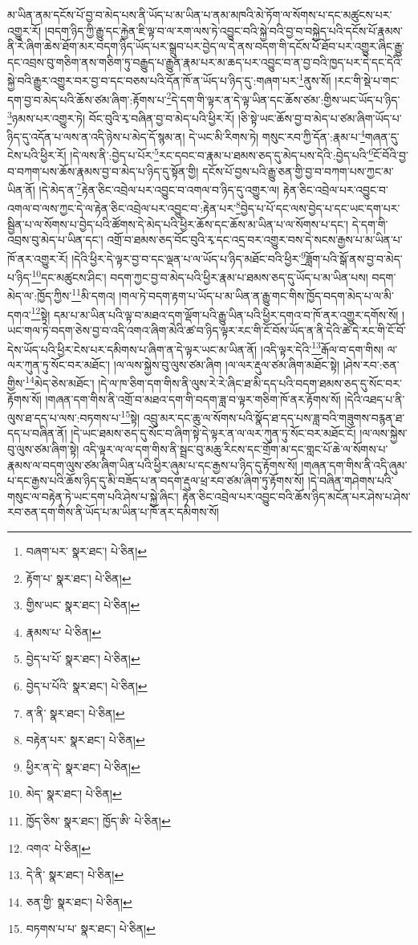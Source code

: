 མ་ཡིན་ནམ་དངོས་པོ་བྱ་བ་མེད་པས་ནི་ཡོད་པ་མ་ཡིན་པ་ནམ་མཁའི་མེ་ཏོག་ལ་སོགས་པ་དང་མཚུངས་པར་འགྱུར་རོ། །བདག་ཉིད་ཀྱི་རྒྱུ་དང་རྐྱེན་ཇི་ལྟ་བ་ལ་རག་ལས་ཏེ་འབྱུང་བའི་སྐྱེ་བའི་བྱ་བ་བསྐྱེད་པའི་དངོས་པོ་རྣམས་ནི་རེ་ཞིག་ཆེས་ཐོག་མར་བདག་ཉིད་ཡོད་པར་སྒྲུབ་པར་བྱེད་ལ་དེ་ནས་བདག་གི་དངོས་པོ་ཐོབ་པར་འགྱུར་ཞིང་རྒྱུ་དང་འབྲས་བུ་གཅིག་ནས་གཅིག་ཏུ་བརྒྱུད་པ་རྒྱུན་རྣམ་པར་མ་ཆད་པར་འབྱུང་བ་ན་བྱ་བའི་ཁྱད་པར་དེ་དང་དེའི་སྐྱེ་བའི་རྒྱུར་འགྱུར་བར་བྱ་བ་དང་བཅས་པའི་དོན་ཁོ་ན་ཡོད་པ་ཉིད་དུ་:གཞག་པར་\footnote{བཞག་པར་  སྣར་ཐང་།  པེ་ཅིན། }ནུས་སོ། །རང་གི་སྡེ་པ་གང་དག་བྱ་བ་མེད་པའི་ཆོས་ཙམ་ཞིག་:རྟོགས་པ་\footnote{རྟོག་པ་  སྣར་ཐང་།  པེ་ཅིན། }དེ་དག་གི་ལྟར་ན་དེ་ལྟ་ཡིན་དང་ཆོས་ཙམ་:གྱིས་ཡང་ཡོད་པ་ཉིད་\footnote{གྱིས་ཡང་  སྣར་ཐང་།  པེ་ཅིན། }ཉམས་པར་འགྱུར་ཏེ། བོང་བུའི་རྭ་བཞིན་བྱ་བ་མེད་པའི་ཕྱིར་རོ། །ཅི་སྟེ་ཡང་ཆོས་བྱ་བ་མེད་པ་ཙམ་ཞིག་ཡོད་པ་ཉིད་དུ་འདོན་པ་ལས་ན་འདི་ཉེས་པ་མེད་དོ་སྙམ་ན། དེ་ཡང་མི་རིགས་ཏེ། གསུང་རབ་ཀྱི་དོན་:རྣམ་པ་\footnote{རྣམས་པ་  པེ་ཅིན། }གཞན་དུ་ངེས་པའི་ཕྱིར་རོ། །དེ་ལས་ནི་:བྱེད་པ་པོར་\footnote{བྱེད་པ་པོ་  སྣར་ཐང་།  པེ་ཅིན། }རང་དབང་བ་རྣམ་པ་ཐམས་ཅད་དུ་མེད་པས་དེའི་:བྱེད་པའི་\footnote{བྱེད་པ་པོའི་  སྣར་ཐང་།  པེ་ཅིན། }ངོ་བོའི་བྱ་བ་བཀག་པས་ཆོས་རྣམས་བྱ་བ་མེད་པ་ཉིད་དུ་སྟོན་གྱི། དངོས་པོ་བྱས་པའི་རྒྱུ་ཅན་གྱི་བྱ་བ་བཀག་པས་ཀྱང་མ་ཡིན་ནོ། །དེ་མེད་ན་\footnote{ན་ནི་  སྣར་ཐང་།  པེ་ཅིན། }རྟེན་ཅིང་འབྲེལ་པར་འབྱུང་བ་འགལ་བ་ཉིད་དུ་འགྱུར་ལ། རྟེན་ཅིང་འབྲེལ་པར་འབྱུང་བ་འགལ་བ་ལས་ཀྱང་དེ་ལ་རྟེན་ཅིང་འབྲེལ་པར་འབྱུང་བ་:རྟེན་པར་\footnote{བརྟེན་པར་  སྣར་ཐང་།  པེ་ཅིན། }བྱེད་པ་པོ་དང་ལས་བྱེད་པ་དང་ཡང་དག་པར་སྦྱིན་པ་ལ་སོགས་པ་བྱེད་པའི་ཚོགས་དེ་མེད་པའི་ཕྱིར་ཆོས་དང་ཆོས་མ་ཡིན་པ་ལ་སོགས་པ་དང་། དེ་དག་གི་འབྲས་བུ་མེད་པ་ཡིན་དང་། འགྲོ་བ་ཐམས་ཅད་བོང་བུའི་རྭ་དང་འདྲ་བར་འགྱུར་བས་དེ་སངས་རྒྱས་པ་མ་ཡིན་པ་ཁོ་ནར་འགྱུར་རོ། །དེའི་ཕྱིར་དེ་ལྟར་བྱ་བ་དང་ལྡན་པ་ལ་ཡོད་པ་ཉིད་མཐོང་བའི་ཕྱིར་\footnote{ཕྱིར་ན་དེ་  སྣར་ཐང་།  པེ་ཅིན། }ཟློག་པའི་སྒོ་ནས་བྱ་བ་མེད་པ་ཉིད་\footnote{མེད་  སྣར་ཐང་།  པེ་ཅིན། }དང་མཚུངས་ཤིང་། བདག་ཀྱང་བྱ་བ་མེད་པའི་ཕྱིར་རྣམ་པ་ཐམས་ཅད་དུ་ཡོད་པ་མ་ཡིན་པས། བདག་མེད་ལ་:ཁྱོད་ཀྱིས་\footnote{ཁྱོད་ཅིས་  སྣར་ཐང་། ཁྱོད་ཨི་  པེ་ཅིན། }མི་དགའ། །གལ་ཏེ་བདག་རྟག་པ་ཡོད་པ་མ་ཡིན་ན་རྒྱུ་གང་གིས་ཁྱོད་བདག་མེད་པ་ལ་མི་དགའ་\footnote{འགའ་  པེ་ཅིན། }སྟེ། དམ་པ་མ་ཡིན་པའི་ལྟ་བ་མཐའ་དག་ལྡོག་པའི་རྒྱུ་ཡིན་པའི་ཕྱིར་དགའ་བ་ཁོ་ནར་འགྱུར་དགོས་སོ། །ཡང་གལ་ཏེ་བདག་ཅེས་བྱ་བ་འདི་འགའ་ཞིག་མེའི་ཚ་བ་ཉིད་ལྟར་རང་གི་ངོ་བོས་ཡོད་ན་ནི་དེའི་ཚེ་དེ་རང་གི་ངོ་བོ་དེས་ཡོད་པའི་ཕྱིར་ངེས་པར་དམིགས་པ་ཞིག་ན་དེ་ལྟར་ཡང་མ་ཡིན་ནོ། །འདི་ལྟར་དེའི་\footnote{དེ་ནི་  སྣར་ཐང་།  པེ་ཅིན། }རྒོལ་བ་དག་གིས། ལ་ལར་ཀུན་ཏུ་སོང་བར་མཐོང་། །ལ་ལས་སྐྱེས་བུ་ལུས་ཙམ་ཞིག །ལ་ལར་རྡུལ་ཙམ་ཞིག་མཐོང་སྟེ། །ཤེས་རབ་:ཅན་གྱིས་\footnote{ཅན་གྱི་  སྣར་ཐང་།  པེ་ཅིན། }མེད་ཅེས་མཐོང་། །དེ་ལ་ཁ་ཅིག་དག་གིས་ནི་ལུས་རེ་རེ་ཞིང་ཐ་མི་དད་པའི་བདག་ཐམས་ཅད་དུ་སོང་བར་རྟོགས་སོ། །གཞན་དག་གིས་ནི་འགྲོ་བ་མཐའ་དག་གི་བདག་ཟླ་བ་ལྟར་གཅིག་ཁོ་ནར་རྟོགས་སོ། །དེའི་འཐད་པ་ནི་ལུས་ཐ་དད་པ་ལས་:བཏགས་པ་\footnote{བཏགས་པ་པ་  སྣར་ཐང་།  པེ་ཅིན། }སྟེ། འབྲུ་མར་དང་ཆུ་ལ་སོགས་པའི་སྣོད་ཐ་དད་པས་ཟླ་བའི་གཟུགས་བརྙན་ཐ་དད་པ་བཞིན་ནོ། །དེ་ཡང་ཐམས་ཅད་དུ་སོང་བ་ཞིག་སྟེ་དེ་ལྟར་ན་ལ་ལར་ཀུན་ཏུ་སོང་བར་མཐོང་ངོ། །ལ་ལས་སྐྱེས་བུ་ལུས་ཙམ་ཞིག་སྟེ། འདི་ལྟར་ལ་ལ་དག་གིས་ནི་སྦྲང་བུ་མཆུ་རིངས་དང་གྲོག་མ་དང་གླང་པོ་ཆེ་ལ་སོགས་པ་རྣམས་ལ་བདག་ལུས་ཙམ་ཞིག་ཡིན་པའི་ཕྱིར་ཞུམ་པ་དང་རྒྱས་པ་ཉིད་དུ་རྟོགས་སོ། །གཞན་དག་གིས་ནི་འདི་ཞུམ་པ་དང་རྒྱས་པའི་ཆོས་ཉིད་དུ་མི་བཟོད་པ་ན་བདག་རྡུལ་ཕྲ་རབ་ཙམ་ཞིག་ཏུ་རྟོགས་སོ། །དེ་བཞིན་གཤེགས་པའི་གསུང་ལ་བརྟེན་ཏེ་ཡང་དག་པའི་ཤེས་པ་སྐྱེ་ཞིང་། རྟེན་ཅིང་འབྲེལ་པར་འབྱུང་བའི་ཆོས་ཉིད་མངོན་པར་ཤེས་པ་ཤེས་རབ་ཅན་དག་གིས་ནི་ཡོད་པ་མ་ཡིན་པ་ཁོ་ནར་དམིགས་སོ། 